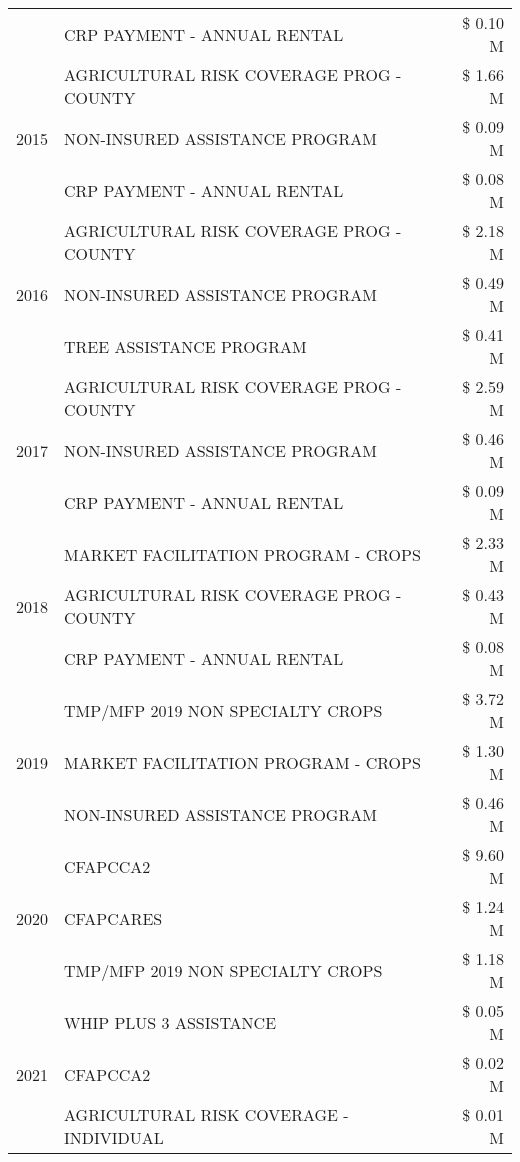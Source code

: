 \begin{tabular}{llr}
 & CRP PAYMENT - ANNUAL RENTAL & \$ 0.10 M \\
\cline{1-3}
\multirow[t]{3}{*}{2015} & AGRICULTURAL RISK COVERAGE PROG - COUNTY & \$ 1.66 M \\
 & NON-INSURED ASSISTANCE PROGRAM & \$ 0.09 M \\
 & CRP PAYMENT - ANNUAL RENTAL & \$ 0.08 M \\
\cline{1-3}
\multirow[t]{3}{*}{2016} & AGRICULTURAL RISK COVERAGE PROG - COUNTY & \$ 2.18 M \\
 & NON-INSURED ASSISTANCE PROGRAM & \$ 0.49 M \\
 & TREE ASSISTANCE PROGRAM & \$ 0.41 M \\
\cline{1-3}
\multirow[t]{3}{*}{2017} & AGRICULTURAL RISK COVERAGE PROG - COUNTY & \$ 2.59 M \\
 & NON-INSURED ASSISTANCE PROGRAM & \$ 0.46 M \\
 & CRP PAYMENT - ANNUAL RENTAL & \$ 0.09 M \\
\cline{1-3}
\multirow[t]{3}{*}{2018} & MARKET FACILITATION PROGRAM - CROPS & \$ 2.33 M \\
 & AGRICULTURAL RISK COVERAGE PROG - COUNTY & \$ 0.43 M \\
 & CRP PAYMENT - ANNUAL RENTAL & \$ 0.08 M \\
\cline{1-3}
\multirow[t]{3}{*}{2019} & TMP/MFP 2019 NON SPECIALTY CROPS & \$ 3.72 M \\
 & MARKET FACILITATION PROGRAM - CROPS & \$ 1.30 M \\
 & NON-INSURED ASSISTANCE PROGRAM & \$ 0.46 M \\
\cline{1-3}
\multirow[t]{3}{*}{2020} & CFAPCCA2 & \$ 9.60 M \\
 & CFAPCARES & \$ 1.24 M \\
 & TMP/MFP 2019 NON SPECIALTY CROPS & \$ 1.18 M \\
\cline{1-3}
\multirow[t]{3}{*}{2021} & WHIP PLUS 3 ASSISTANCE & \$ 0.05 M \\
 & CFAPCCA2 & \$ 0.02 M \\
 & AGRICULTURAL RISK COVERAGE - INDIVIDUAL & \$ 0.01 M \\
\cline{1-3}
\bottomrule
\end{tabular}

